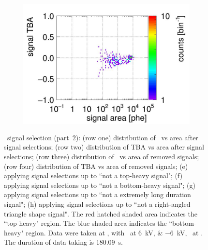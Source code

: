\begin{landscape}
\begin{figure}[!p]
\begin{subfigure}[t]{0.33\textwidth}
			\includegraphics[width=\figurewidth,clip,trim={0 0 0 40}]{Figures/GasTest/CutsValid/res64767/tbapaX10Vecfig64767.jpg}
			\caption{}
			\label{fig:signal selection 10}
		\end{subfigure}
		\caption[\gtest\ signal selection (part~2).]{\gtest\ signal selection (part~2): 
			(row one) distribution of \rpdshort\ vs area after signal selections;
(row two) distribution of TBA vs area after signal selections;
(row three) distribution of \rpdshort\ vs area of removed signals;
(row four) distribution of TBA vs area of removed signals;
(e) applying signal selections up to ``not a top-heavy signal";
(f) applying signal selections up to ``not a bottom-heavy signal";
(g) applying signal selections up to ``not a extremely long duration signal";
(h) applying signal selections up to ``not a right-angled triangle shape signal".
The red hatched shaded area indicates the ``top-heavy" region.
The blue shaded area indicates the ``bottom-heavy" region.
		Data were taken at , with \opvtvb\ at \SIlist{+6;-6}{kV}, \opgd\ at \standarddensity . The duration of data taking is \SI{180.09}{\s}.
		}
		\label{fig:signal selection l2}
	\end{figure}
\end{landscape}
